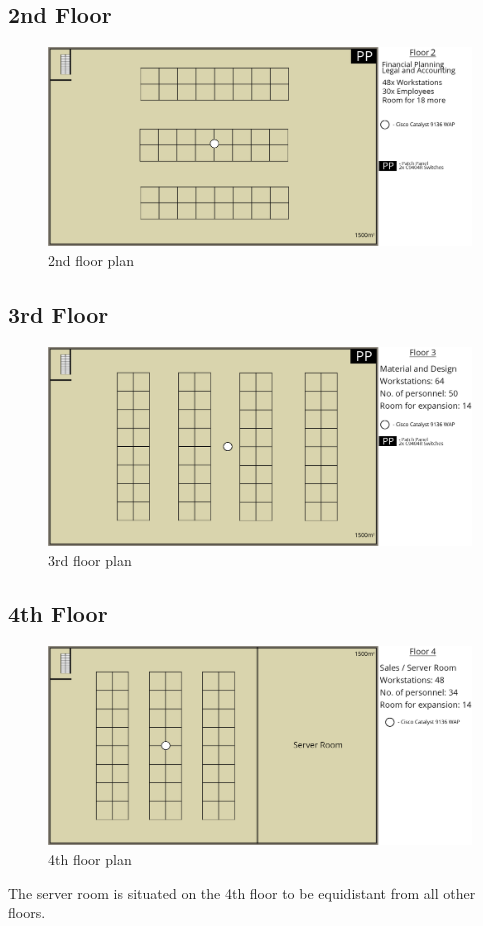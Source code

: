\subsection{2nd Floor}
\begin{figure}[H]
    \includegraphics[width=15cm]{Figures/2nd-floor.png}
    \caption{2nd floor plan}
    \label{fig:2nd_floor}
\end{figure}
\subsection{3rd Floor}
\begin{figure}[H]
    \includegraphics[width=15cm]{Figures/3rd-Floor.png}
    \caption{3rd floor plan}
    \label{fig:3rd_floor}
\end{figure}
\subsection{4th Floor}
\begin{figure}[H]
    \includegraphics[width=15cm]{Figures/4th-Floor.png}
    \caption{4th floor plan}
    \label{fig:4th_floor}
\end{figure}
The server room is situated on the 4th floor to be equidistant from all other floors.
